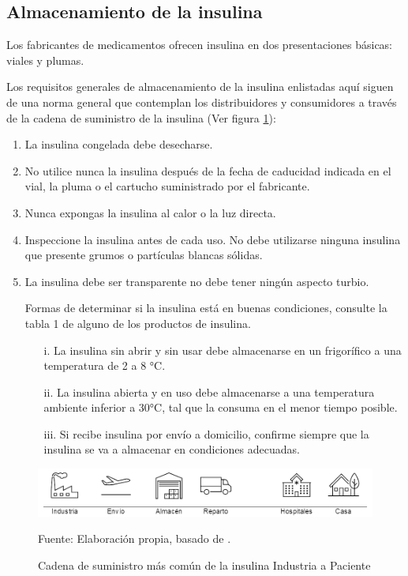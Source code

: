 \subsection{Almacenamiento de la insulina}

 
Los fabricantes de medicamentos ofrecen insulina en dos presentaciones básicas: viales y plumas.
 
Los requisitos generales de almacenamiento de la insulina enlistadas aquí siguen de una norma general que contemplan los distribuidores y consumidores a través de la cadena de suministro de la insulina (Ver figura \ref{fig:suministro}):

\begin{enumerate}
	 \item	La insulina congelada debe desecharse.
	\item	No utilice nunca la insulina después de la fecha de caducidad indicada en el vial, la pluma o el cartucho suministrado por el fabricante.
	\item	Nunca expongas la insulina al calor o la luz directa.
	\item Inspeccione la insulina antes de cada uso. No debe utilizarse ninguna insulina que presente grumos o partículas blancas sólidas.
\item La insulina debe ser transparente no debe tener ningún aspecto turbio.

	Formas de determinar si la insulina está en buenas condiciones, consulte la tabla 1 de alguno de los productos de insulina.
\begin{enumerate}
\item[i.]	La insulina sin abrir y sin usar debe almacenarse en un frigorífico a una temperatura de 2 a 8 °C.
\item[ii.]	La insulina abierta y en uso debe almacenarse a una temperatura ambiente inferior a 30°C, tal que la consuma en el menor tiempo posible.
\item[iii.]	Si recibe insulina por envío a domicilio, confirme siempre que la insulina se va a almacenar en condiciones adecuadas.
	\end{enumerate}
\end{enumerate}



\begin{figure}[H]
	\centering
	\includegraphics{figures/suministro}
	\caption{Cadena de suministro más común de la insulina Industria a Paciente}
	Fuente: Elaboración propia, basado de \cite{opsonu}.
	\label{fig:suministro}
\end{figure}



